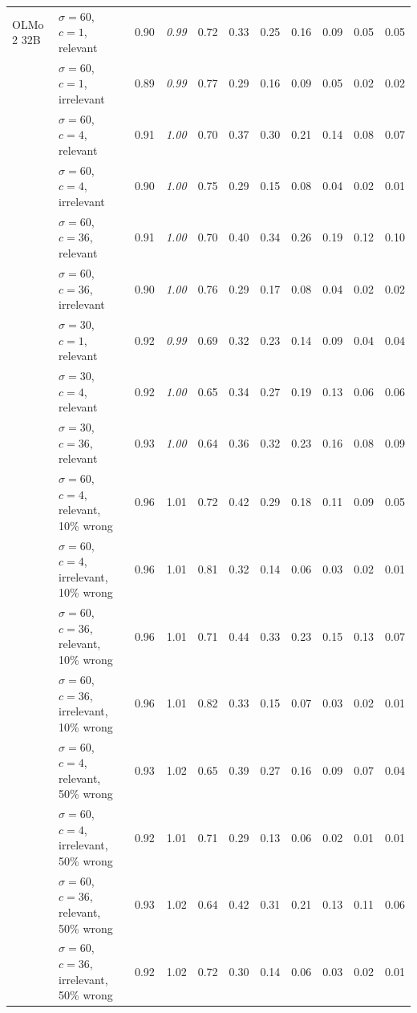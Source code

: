 \begin{tabular}{llrrrrrrrrr}
\midrule
OLMo 2 32B & $\sigma = 60$, $c = 1$, relevant & 0.90 & \textit{0.99} & 0.72 & 0.33 & 0.25 & 0.16 & 0.09 & 0.05 & 0.05 \\
 & $\sigma = 60$, $c = 1$, irrelevant & 0.89 & \textit{0.99} & 0.77 & 0.29 & 0.16 & 0.09 & 0.05 & 0.02 & 0.02 \\
 & $\sigma = 60$, $c = 4$, relevant & 0.91 & \textit{1.00} & 0.70 & 0.37 & 0.30 & 0.21 & 0.14 & 0.08 & 0.07 \\
 & $\sigma = 60$, $c = 4$, irrelevant & 0.90 & \textit{1.00} & 0.75 & 0.29 & 0.15 & 0.08 & 0.04 & 0.02 & 0.01 \\
 & $\sigma = 60$, $c = 36$, relevant & 0.91 & \textit{1.00} & 0.70 & 0.40 & 0.34 & 0.26 & 0.19 & 0.12 & 0.10 \\
 & $\sigma = 60$, $c = 36$, irrelevant & 0.90 & \textit{1.00} & 0.76 & 0.29 & 0.17 & 0.08 & 0.04 & 0.02 & 0.02 \\
 & $\sigma = 30$, $c = 1$, relevant & 0.92 & \textit{0.99} & 0.69 & 0.32 & 0.23 & 0.14 & 0.09 & 0.04 & 0.04 \\
 & $\sigma = 30$, $c = 4$, relevant & 0.92 & \textit{1.00} & 0.65 & 0.34 & 0.27 & 0.19 & 0.13 & 0.06 & 0.06 \\
 & $\sigma = 30$, $c = 36$, relevant & 0.93 & \textit{1.00} & 0.64 & 0.36 & 0.32 & 0.23 & 0.16 & 0.08 & 0.09 \\
 & $\sigma = 60$, $c = 4$, relevant, 10\% wrong & 0.96 & 1.01 & 0.72 & 0.42 & 0.29 & 0.18 & 0.11 & 0.09 & 0.05 \\
 & $\sigma = 60$, $c = 4$, irrelevant, 10\% wrong & 0.96 & 1.01 & 0.81 & 0.32 & 0.14 & 0.06 & 0.03 & 0.02 & 0.01 \\
 & $\sigma = 60$, $c = 36$, relevant, 10\% wrong & 0.96 & 1.01 & 0.71 & 0.44 & 0.33 & 0.23 & 0.15 & 0.13 & 0.07 \\
 & $\sigma = 60$, $c = 36$, irrelevant, 10\% wrong & 0.96 & 1.01 & 0.82 & 0.33 & 0.15 & 0.07 & 0.03 & 0.02 & 0.01 \\
 & $\sigma = 60$, $c = 4$, relevant, 50\% wrong & 0.93 & 1.02 & 0.65 & 0.39 & 0.27 & 0.16 & 0.09 & 0.07 & 0.04 \\
 & $\sigma = 60$, $c = 4$, irrelevant, 50\% wrong & 0.92 & 1.01 & 0.71 & 0.29 & 0.13 & 0.06 & 0.02 & 0.01 & 0.01 \\
 & $\sigma = 60$, $c = 36$, relevant, 50\% wrong & 0.93 & 1.02 & 0.64 & 0.42 & 0.31 & 0.21 & 0.13 & 0.11 & 0.06 \\
 & $\sigma = 60$, $c = 36$, irrelevant, 50\% wrong & 0.92 & 1.02 & 0.72 & 0.30 & 0.14 & 0.06 & 0.03 & 0.02 & 0.01 \\
\bottomrule
\end{tabular}
